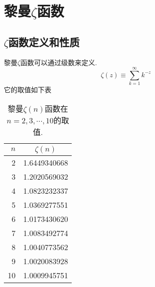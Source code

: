 \section{黎曼$\zeta$函数}

\subsection{$\zeta$函数定义和性质}
黎曼$\zeta$函数可以通过级数来定义.
\begin{equation}
    \zeta(z) \equiv \sum_{k=1}^{\infty} k^{-z}
\end{equation}
它的取值如下表
\begin{table}
    \centering
\begin{tabular}{rc}
    \hline$n$ & $\zeta(n)$ \\
    \hline 2 & 1.6449340668 \\
    3 & 1.2020569032 \\
    4 & 1.0823232337 \\
    5 & 1.0369277551 \\
    6 & 1.0173430620 \\
    7 & 1.0083492774 \\
    8 & 1.0040773562 \\
    9 & 1.0020083928 \\
    10 & 1.0009945751 \\
    \hline
\end{tabular}
\caption{黎曼$\zeta(n)$函数在$n=2,3,\cdots, 10$的取值.}
\end{table}
